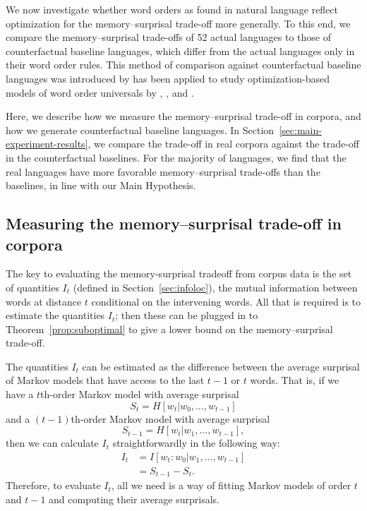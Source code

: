 We now investigate whether word orders as found in natural language reflect optimization for the memory--surprisal trade-off more generally.
To this end, we compare the memory--surprisal trade-offs of 52 actual languages to those of counterfactual baseline languages, which differ from the actual languages only in their word order rules. This method of comparison against counterfactual baseline languages was introduced by \citet{gildea-optimizing-2007,gildea-grammars-2010} has been applied to study optimization-based models of word order universals by \citet{futrell-large-scale-2015}, \citet{gildea-human-2015}, and \citet{hahn2020optimization}.

Here, we describe how we measure the memory--surprisal trade-off in corpora, and how we generate counterfactual baseline languages. In Section~\ref{sec:main-experiment-results}, we compare the trade-off in real corpora against the trade-off in the counterfactual baselines. For the majority of languages, we find that the real languages have more favorable memory--surprisal trade-offs than the baselines, in line with our Main Hypothesis.

\subsection{Measuring the memory--surprisal trade-off in corpora}

The key to evaluating the memory-surprisal tradeoff from corpus data is the set of quantities $I_t$ (defined in Section~\ref{sec:infoloc}), the  mutual information between words at distance $t$ conditional on the intervening words. 
All that is required is to estimate the quantities $I_t$; then these can be plugged in to Theorem~\ref{prop:suboptimal} to give a lower bound on the memory--surprisal trade-off. 

The quantities $I_t$ can be estimated as the difference between the average surprisal of Markov models that have access to the last $t-1$ or $t$ words.
That is, if we have a $t$th-order Markov model with average surprisal
\begin{equation*}
    S_t = H[w_t | w_0, \dots, w_{t-1}]
\end{equation*}
and a $(t-1)$th-order Markov model with average surprisal
\begin{equation*}
    S_{t-1} = H[w_t | w_1, \dots, w_{t-1}],
\end{equation*}
then we can calculate $I_t$ straightforwardly in the following way:
\begin{align}
    \nonumber
    I_t &= I[w_t : w_0 | w_1, \dots, w_{t-1}] \\
    \nonumber
    &= S_{t-1} - S_t.
\end{align}
Therefore, to evaluate $I_t$, all we need is a way of fitting Markov models of order $t$ and $t-1$ and computing their average surprisals.


